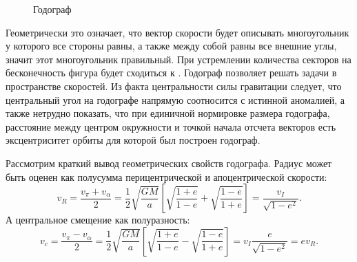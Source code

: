 \begin{wrapfigure}[10]{l}{0.33\tw}
    \centering
    \vspace{-1pc}
    \caption{Годограф}
    \label{pic:hodograph2}
\end{wrapfigure}
\noindent Геометрически это означает, что вектор скорости будет описывать многоугольник у которого все стороны равны, а также между собой равны все внешние углы, значит этот многоугольник правильный. При устремлении количества секторов на бесконечность фигура будет сходиться к . Годограф позволяет решать задачи в пространстве скоростей. Из факта центральности силы гравитации следует, что центральный угол на годографе напрямую соотносится с истинной аномалией, а также нетрудно показать, что при единичной нормировке размера годографа, расстояние между центром окружности и точкой начала отсчета векторов есть эксцентриситет орбиты для которой был построен годограф.

Рассмотрим краткий вывод геометрических свойств годографа. Радиус может быть оценен как полусумма перицентрической и апоцентрической скорости:
\begin{equation*}
    v_{R} = \frac{v_{\pi}+v_{\alpha}}{2}=\frac{1}{2}\sqrt{\frac{GM}{a}}\left[\sqrt{\frac{1+e}{1-e}}+\sqrt{\frac{1-e}{1+e}}\right]=\frac{v_I}{\sqrt{1-e^2}}.
\end{equation*}
А центральное смещение как полуразность:
\begin{equation*}
    v_{c} = \frac{v_{\pi}-v_{\alpha}}{2}=\frac{1}{2}\sqrt{\frac{GM}{a}}\left[\sqrt{\frac{1+e}{1-e}}-\sqrt{\frac{1-e}{1+e}}\right]=v_{I}\frac{e}{\sqrt{1-e^2}}=e v_{R}.
\end{equation*}

